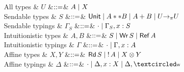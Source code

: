 \begin{figure*}[t]
  \begin{grammar}
    All types
    & $U$
    &$\mathrel{::=}$& $A \mathrel{\mid} X$
    \\
    Sendable types
    & $S$
    &$\mathrel{::=}$& $\text{\textsf{Unit}} \mathrel{\mid} {A} ** {B} \mathrel{\mid} {A} + {B} \mathrel{\mid} U
    {->}_{\pi} U$
    \\
    Sendable typings
    & ${\Gamma}_S$
    &$\mathrel{::=}$& $\cdot \mathrel{\mid} {\Gamma}_S,x:S$
    \\
    Intuitionistic types
    & $A,B$
    &$\mathrel{::=}$& $S \mathrel{\mid} \text{\textsf{Wr}}\,S \mathrel{\mid} \text{\textsf{Ref}}\,A$
    \\
    Intuitionistic typings
    & $\Gamma$
    &$\mathrel{::=}$& $\cdot \mathrel{\mid} \Gamma,x:A$
    \\
    Affine types
    & $X,Y$
    &$\mathrel{::=}$& $\text{\textsf{Rd}}\,S \mathrel{\mid} {!}\,{A} \mathrel{\mid}
    {X}\otimes{Y}$
    \\
    Affine typings
    & $\Delta$
    &$\mathrel{::=}$& $\emptyctxt \bnfalt \Delta,x:X \bnfalt \Delta, \wrtok$
  \end{grammar}
  \begin{comment}
  \begin{grammar}
    All types
    & $U$
    &$\bnfas$& $A \bnfalt X$
    \\    
    Sendable types
    & $S$
    &$\bnfas$& $\tyUnit \bnfalt \tyProd{A}{B} \bnfalt \tySum{A}{B} \bnfalt A ->
    B \bnfalt X \multimap Y$
    \\
    Sendable typings
    & ${\Gamma}_S$
    &$\bnfas$& $\emptyctxt \bnfalt {\Gamma}_S,x:S$
    \\
    Intuitionistic types
    & $A,B$
    &$\bnfas$& $S \bnfalt \tyWr{S} \bnfalt \tyRef{A}$
    \\
    Intuitionistic typings
    & $\Gamma$
    &$\bnfas$& $\emptyctxt \bnfalt \Gamma,x:A$
    \\
    Affine types
    & $X,Y$
    &$\bnfas$& $\tyRd{S} \bnfalt \tyBang{A} \bnfalt

\end{comment}
\end{figure*}
